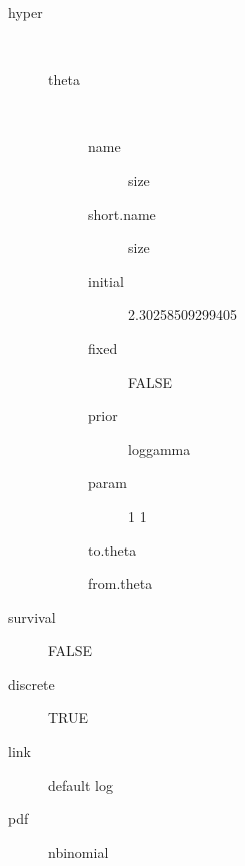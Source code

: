 \begin{description}
	\item[hyper]\ 
	 \begin{description}
	 	\item[theta]\ 
	 	 \begin{description}
	 	 	 \item[ name ] size 
	 	 	 \item[ short.name ] size 
	 	 	 \item[ initial ] 2.30258509299405 
	 	 	 \item[ fixed ] FALSE 
	 	 	 \item[ prior ] loggamma 
	 	 	 \item[ param ] 1 1 
	 	 	 \item[ to.theta ] \verb|| 
	 	 	 \item[ from.theta ] \verb|| 
	 	 \end{description}
	 \end{description}
	 \item[ survival ] FALSE 
	 \item[ discrete ] TRUE 
	 \item[ link ] default log 
	 \item[ pdf ] nbinomial 
\end{description}
